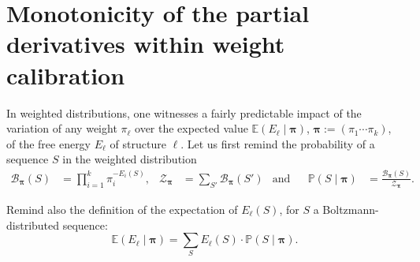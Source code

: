 \documentclass[10pt]{article}
\newcommand{\partfun}[1]{\mathcal{Z}_{#1}}
\begin{document}
\section{Monotonicity of the partial derivatives within weight calibration}
\label{appsec:weight_derivatives}

%
In weighted distributions, one witnesses a fairly predictable impact of the variation of any weight $\pi_\ell$ over the expected value $\mathbb{E}(E_\ell\mid \pmb{\pi})$, $\pmb{\pi}:= (\pi_1\cdots\pi_k)$, of the free energy $E_\ell$ of structure $\ell$.  Let us  first remind the probability of a sequence $S$ in the weighted distribution
\begin{align*}
  \mathcal{B}_{\pmb{\pi}}(S) &= \prod_{i=1}^{k} \pi_i^{-E_i(S)}, &
  \partfun{\pmb{\pi}}&=\sum_{S'}\mathcal{B}_{\pmb{\pi}}(S') &
    \text{and}& &
  \mathbb{P}(S\mid \pmb{\pi}) &= \frac{\mathcal{B}_{\pmb{\pi}}(S)}{\partfun{\pmb{\pi}}}.
  \end{align*}

Remind also the definition of the expectation of $E_\ell(S)$, for $S$ a Boltzmann-distributed sequence:
$$\mathbb{E}(E_\ell\mid \pmb{\pi}) = \sum_S E_\ell(S)\cdot \mathbb{P}(S\mid \pmb{\pi}).$$
\end{document}
